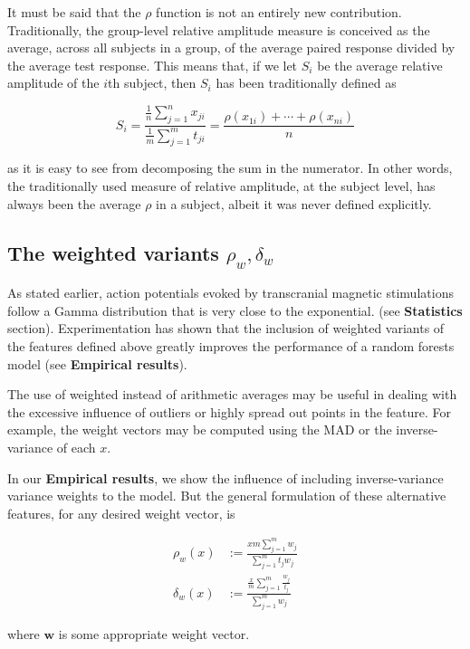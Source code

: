 \documentclass{article}
\begin{document}
\begin{multicols}{2}
It must be said that the $\rho$ function is not an entirely new contribution.
Traditionally, the group-level relative amplitude measure is conceived as the
average, across all subjects in a group, of the average paired response divided
by the average test response. This means that, if we let $S_i$ be the average
relative amplitude of the $i$th subject, then $S_i$ has been traditionally
defined as

\begin{equation*} 
    S_i=\frac{\frac{1}{n}\sum_{j=1}^n x_{ji}}{\frac{1}{m}\sum_{j=1}^m t_{ji}} = 
    \frac{\rho(x_{1i})+\cdots + \rho(x_{ni})}{n} 
\end{equation*}

as it is easy to see from decomposing the sum in the
numerator. In other words, the traditionally used measure of
relative amplitude, at the subject level, has always been
the average $\rho$ in a subject, albeit it was never defined explicitly.

\subsection{The weighted variants $\rho_w, \delta_w$}

As stated earlier, action potentials evoked by transcranial magnetic
stimulations follow a Gamma distribution that is very close to the exponential.
(see \textbf{Statistics} section). Experimentation has shown that the inclusion
of weighted variants of the features defined above greatly improves the
performance of a random forests model (see \textbf{Empirical results}).

The use of weighted instead of arithmetic averages may be useful in dealing with
the excessive influence of outliers or highly spread out points in the feature.
For example, the weight vectors may be computed using the MAD or the
inverse-variance of each $x$. 

In our \textbf{Empirical results}, we show the influence of including
inverse-variance variance weights to the model. But the general formulation of
these alternative features, for any desired weight vector, is

\begin{align} 
    \rho_w(x) &:= \frac{xm\sum_{j=1}^m w_j}{\sum_{j=1}^m t_j w_j} \\ 
    \delta_w(x) &:= \frac{\frac{x}{m}\sum_{j=1}^m\frac{w_j}{t_j}}{\sum_{j=1}^mw_j} 
\end{align}

where $\textbf{w}$ is some appropriate weight vector.


\end{multicols}
\end{document}
